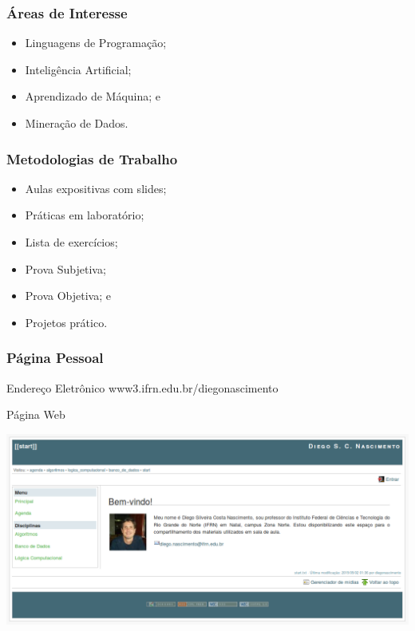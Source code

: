 \documentclass{beamer}
\begin{document}
\begin{frame}
	\frametitle{Áreas de Interesse}
	
	\begin{itemize}
        \item Linguagens de Programação;
		\item Inteligência Artificial;
		\item Aprendizado de Máquina; e
		\item Mineração de Dados.
	\end{itemize}
\end{frame}

\begin{frame}
	\frametitle{Metodologias de Trabalho}
	
	\begin{itemize}
		\item Aulas expositivas com slides;
		\item Práticas em laboratório;
		\item Lista de exercícios;
	    \item Prova Subjetiva;
	    \item Prova Objetiva; e 
		\item Projetos prático.
	\end{itemize}
\end{frame}

\begin{frame}
	\frametitle{Página Pessoal}
	
	\begin{block}{Endereço Eletrônico}
	www3.ifrn.edu.br/diegonascimento
	\end{block} \vfill
	
	\begin{exampleblock}{Página Web}
		\begin{center}
			\includegraphics[scale=0.25]{imagens/pagina}
		\end{center}
	\end{exampleblock}
\end{frame}
\end{document}
